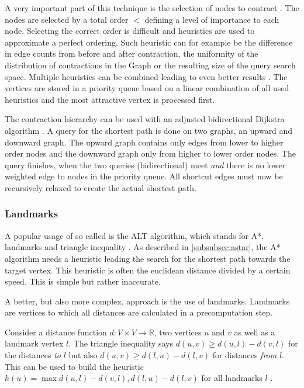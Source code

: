 			A very important part of this technique is the selection of nodes to contract \cite[14]{geisberger-contraction-hierarchies}.
			The nodes are selected by a total order $<$ defining a level of importance to each node.
			Selecting the correct order is difficult and heuristics are used to approximate a perfect ordering.
			Such heuristic can for example be the difference in edge counts from before and after contraction, the uniformity of the distribution of contractions in the Graph or the resulting size of the query search space.
			Multiple heuristics can be combined leading to even better results \cite[49]{geisberger-contraction-hierarchies}.
			The vertices are stored in a priority queue based on a linear combination of all used heuristics and the most attractive vertex is processed first.
			
			The contraction hierarchy can be used with an adjusted bidirectional Dijkstra algorithm \cite[29-30]{geisberger-contraction-hierarchies}.
			A query for the shortest path is done on two graphs, an upward and downward graph.
			The upward graph contains only edges from lower to higher order nodes and the downward graph only from higher to lower order nodes.
			The query finishes, when the two queries (bidirectional) meet \emph{and} there is no lower weighted edge to nodes in the priority queue.
			All shortcut edges must now be recursively relaxed to create the actual shortest path.
		
		\subsubsection{Landmarks}
		
			A popular usage of so called  is the ALT algorithm, which stands for A*, landmarks and triangle inequality \cite{goldberg-landmarks}.
			As described in \cref{subsubsec:astar}, the A* algorithm needs a heuristic leading the search for the shortest path towards the target vertex.
			This heuristic is often the euclidean distance divided by a certain speed.
			This is simple but rather inaccurate.
			
			A better, but also more complex, approach is the use of landmarks.
			Landmarks are vertices to which all distances are calculated in a precomputation step.
			
			Consider a distance function $d : V \times V \rightarrow \mathbb{R}$, two vertices $u$ and $v$ as well as a landmark vertex $l$.
			The triangle inequality says $d(u,v) \geq d(u,l) - d(v,l)$ for the distances \emph{to} $l$ but also $d(u,v) \geq d(l,u) - d(l,v)$ for distances \emph{from} $l$.
			This can be used to build the heuristic $h(u) = \max{d(u,l)-d(v,l), d(l,u)-d(l,v)}$ for all landmarks $l$ \cite[6-7]{goldberg-landmarks}.
			
